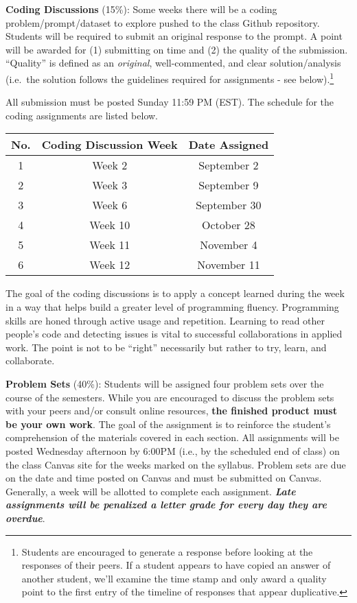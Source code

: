 \documentclass[
  12pt,
]{article}
\begin{document}
\textbf{Coding Discussions} (15\%): Some weeks there will be a coding
problem/prompt/dataset to explore pushed to the class Github repository.
Students will be required to submit an original response to the prompt.
A point will be awarded for (1) submitting on time and (2) the quality
of the submission. ``Quality'' is defined as an \emph{original},
well-commented, and clear solution/analysis (i.e.~the solution follows
the guidelines required for assignments - see below).\footnote{Students
  are encouraged to generate a response before looking at the responses
  of their peers. If a student appears to have copied an answer of
  another student, we'll examine the time stamp and only award a quality
  point to the first entry of the timeline of responses that appear
  duplicative.}

All submission must be posted Sunday 11:59 PM (EST). The schedule for
the coding assignments are listed below.

\begin{longtable}[]{@{}ccc@{}}
\toprule
No. & Coding Discussion Week & Date Assigned\tabularnewline
\midrule
\endhead
1 & Week 2 & September 2\tabularnewline
2 & Week 3 & September 9\tabularnewline
3 & Week 6 & September 30\tabularnewline
4 & Week 10 & October 28\tabularnewline
5 & Week 11 & November 4\tabularnewline
6 & Week 12 & November 11\tabularnewline
\bottomrule
\end{longtable}

The goal of the coding discussions is to apply a concept learned during
the week in a way that helps build a greater level of programming
fluency. Programming skills are honed through active usage and
repetition. Learning to read other people's code and detecting issues is
vital to successful collaborations in applied work. The point is not to
be ``right'' necessarily but rather to try, learn, and collaborate.

\textbf{Problem Sets} (40\%): Students will be assigned four problem
sets over the course of the semesters. While you are encouraged to
discuss the problem sets with your peers and/or consult online
resources, \textbf{the finished product must be your own work}. The goal
of the assignment is to reinforce the student's comprehension of the
materials covered in each section. All assignments will be posted
Wednesday afternoon by 6:00PM (i.e., by the scheduled end of class) on
the class Canvas site for the weeks marked on the syllabus. Problem sets
are due on the date and time posted on Canvas and must be submitted on
Canvas. Generally, a week will be allotted to complete each assignment.
\textbf{\emph{Late assignments will be penalized a letter grade for
every day they are overdue}}.
\end{document}
